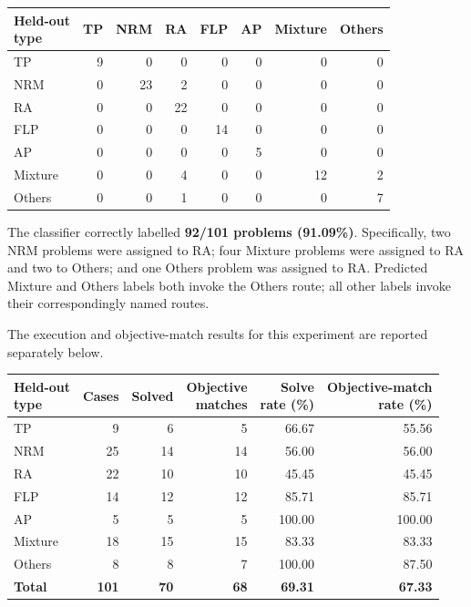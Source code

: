 \documentclass[11pt]{article}
\begin{document}
\begin{enumerate}[label=(AssoE.\arabic*),leftmargin=*]
\begin{enumerate}[label=(R1.Major.\arabic*),leftmargin=*]
\begin{center}
\small
\setlength{\tabcolsep}{5pt}
\renewcommand{\arraystretch}{1.12}
\begin{tabular}{lrrrrrrr}
\hline
\shortstack[l]{Held-out\\type}
& TP & NRM & RA & FLP & AP & Mixture & Others \\
\hline
TP      & 9 & 0  & 0  & 0  & 0 & 0  & 0 \\
NRM     & 0 & 23 & 2  & 0  & 0 & 0  & 0 \\
RA      & 0 & 0  & 22 & 0  & 0 & 0  & 0 \\
FLP     & 0 & 0  & 0  & 14 & 0 & 0  & 0 \\
AP      & 0 & 0  & 0  & 0  & 5 & 0  & 0 \\
Mixture & 0 & 0  & 4  & 0  & 0 & 12 & 2 \\
Others  & 0 & 0  & 1  & 0  & 0 & 0  & 7 \\
\hline
\end{tabular}
\end{center}

The classifier correctly labelled \textbf{92/101 problems (91.09\%)}. Specifically, two NRM problems were assigned to RA; four Mixture problems were assigned to RA and two to Others; and one Others problem was assigned to RA. Predicted Mixture and Others labels both invoke the Others route; all other labels invoke their correspondingly named routes.

The execution and objective-match results for this experiment are reported separately below.

\begin{center}
\small
\setlength{\tabcolsep}{5pt}
\renewcommand{\arraystretch}{1.12}
\begin{tabular}{lrrrrr}
\hline
\shortstack[l]{Held-out\\type}
& Cases
& Solved
& \shortstack{Objective\\matches}
& \shortstack{Solve\\rate (\%)}
& \shortstack{Objective-match\\rate (\%)} \\
\hline
TP      & 9  & 6  & 5  & 66.67  & 55.56 \\
NRM     & 25 & 14 & 14 & 56.00  & 56.00 \\
RA      & 22 & 10 & 10 & 45.45  & 45.45 \\
FLP     & 14 & 12 & 12 & 85.71  & 85.71 \\
AP      & 5  & 5  & 5  & 100.00 & 100.00 \\
Mixture & 18 & 15 & 15 & 83.33  & 83.33 \\
Others  & 8  & 8  & 7  & 100.00 & 87.50 \\
\hline
\textbf{Total}
& \textbf{101}
& \textbf{70}
& \textbf{68}
& \textbf{69.31}
& \textbf{67.33} \\
\hline
\end{tabular}
\end{center}


\end{enumerate}
\end{enumerate}
\end{document}

